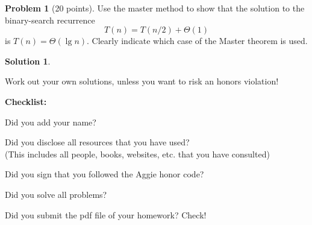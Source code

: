 \documentclass{article}
\theoremstyle{definition}
\newtheorem{problem}{Problem}
\newtheorem*{solution}{Solution}
\newcommand{\checklist}{\noindent\textbf{Checklist:}
\begin{compactitem}[$\Box$] 
\item Did you add your name? 
\item Did you disclose all resources that you have used? \\
(This includes all people, books, websites, etc. that you have consulted)
\item Did you sign that you followed the Aggie honor code? 
\item Did you solve all problems? 
\item Did you submit the pdf file of your homework? Check!
\end{compactitem}
}
\begin{document}
\begin{problem}[20 points]
Use the master method to show that the solution to the binary-search 
recurrence 
$$ T(n) = T(n/2)+\Theta(1)$$
is $T(n) = \Theta(\lg n)$. Clearly indicate which case of the Master
theorem is used.  
\end{problem}
\begin{solution}
\end{solution}

Work out your own solutions, unless you want to risk an honors
violation!
\medskip



\goodbreak
\checklist
\end{document}
